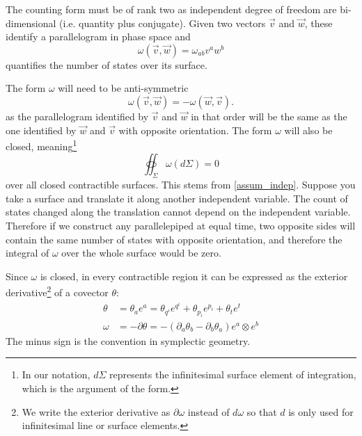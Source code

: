 \documentclass[10pt,twocolumn, nofootinbib]{revtex4-2}
\begin{document}
The counting form must be of rank two as independent degree of freedom are bi-dimensional (i.e. quantity plus conjugate). Given two vectors $\vec{v}$ and $\vec{w}$, these identify a parallelogram in phase space and 
\begin{equation}\label{mdof_form_applied}
	\omega(\vec{v}, \vec{w}) = \omega_{ab} v^a w^b
\end{equation}
quantifies the number of states over its surface.

The form $\omega$ will need to be anti-symmetric
\begin{equation}\label{mdof_form_antisymm}
	\omega(\vec{v}, \vec{w}) = - \omega(\vec{w}, \vec{v}).
\end{equation}
as the parallelogram identified by $\vec{v}$ and $\vec{w}$ in that order will be the same as the one identified by $\vec{w}$ and $\vec{v}$ with opposite orientation. The form $\omega$ will also be closed, meaning\footnote{In our notation, $d\Sigma$ represents the infinitesimal surface element of integration, which is the argument of the form.}
\begin{equation}\label{mdof_closed_form}
	\oiint_\Sigma \omega(d\Sigma) = 0
\end{equation}
over all closed contractible surfaces. This stems from \ref{assum_indep}. Suppose you take a surface and translate it along another independent variable. The count of states changed along the translation cannot depend on the independent variable. Therefore if we construct any parallelepiped at equal time, two opposite sides will contain the same number of states with opposite orientation, and therefore the integral of $\omega$ over the whole surface would be zero.

Since $\omega$ is closed, in every contractible region it can be expressed as the exterior derivative\footnote{We write the exterior derivative as $\partial \omega$ instead of $d \omega$ so that $d$ is only used for infinitesimal line or surface elements.} of a covector $\theta$:
\begin{equation}\label{mdof_form_potential}
	\begin{aligned}
		\theta &= \theta_a e^a = \theta_{q^i} e^{q^i} + \theta_{p_i} e^{p_i} + \theta_t e^t \\
		\omega &= - \partial \theta = - \left( \partial_a \theta_b - \partial_b \theta_a \right) e^a \otimes e^b
	\end{aligned}
\end{equation}
The minus sign is the convention in symplectic geometry.
\end{document}
